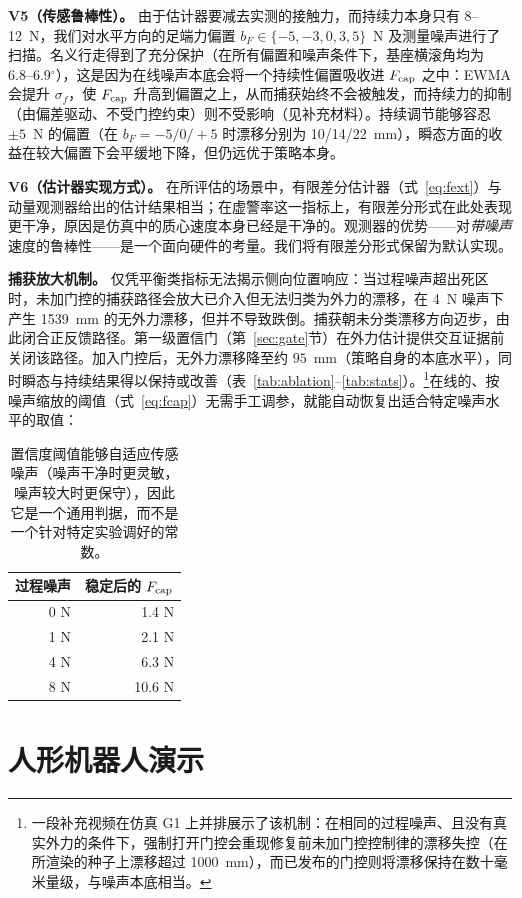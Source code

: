 \documentclass[journal]{IEEEtran}
\begin{document}
\textbf{V5（传感鲁棒性）。} 由于估计器要减去实测的接触力，而持续力本身只有 8–12~N，我们对水平方向的足端力偏置 $b_F\in\{-5,-3,0,3,5\}$~N 及测量噪声进行了扫描。名义行走得到了充分保护（在所有偏置和噪声条件下，基座横滚角均为 6.8–6.9$^\circ$），这是因为在线噪声本底会将一个持续性偏置吸收进 $F_{\rm cap}$ 之中：EWMA 会提升 $\sigma_f$，使 $F_{\rm cap}$ 升高到偏置之上，从而捕获始终不会被触发，而持续力的抑制（由偏差驱动、不受门控约束）则不受影响（见补充材料）。持续调节能够容忍 $\pm 5$~N 的偏置（在 $b_F=-5/0/+5$ 时漂移分别为 10/14/22~mm），瞬态方面的收益在较大偏置下会平缓地下降，但仍远优于策略本身。

\textbf{V6（估计器实现方式）。} 在所评估的场景中，有限差分估计器（式~\eqref{eq:fext}）与动量观测器给出的估计结果相当；在虚警率这一指标上，有限差分形式在此处表现更干净，原因是仿真中的质心速度本身已经是干净的。观测器的优势——对\emph{带噪声}速度的鲁棒性——是一个面向硬件的考量。我们将有限差分形式保留为默认实现。

\textbf{捕获放大机制。} 仅凭平衡类指标无法揭示侧向位置响应：当过程噪声超出死区时，未加门控的捕获路径会放大已介入但无法归类为外力的漂移，在 4~N 噪声下产生 1539~mm 的无外力漂移，但并不导致跌倒。捕获朝未分类漂移方向迈步，由此闭合正反馈路径。第一级置信门（第~\ref{sec:gate}节）在外力估计提供交互证据前关闭该路径。加入门控后，无外力漂移降至约 $95$~mm（策略自身的本底水平），同时瞬态与持续结果得以保持或改善（表~\ref{tab:ablation}–\ref{tab:stats}）。\footnote{一段补充视频在仿真 G1 上并排展示了该机制：在相同的过程噪声、且没有真实外力的条件下，强制打开门控会重现修复前未加门控控制律的漂移失控（在所渲染的种子上漂移超过 1000~mm），而已发布的门控则将漂移保持在数十毫米量级，与噪声本底相当。}在线的、按噪声缩放的阈值（式~\eqref{eq:fcap}）无需手工调参，就能自动恢复出适合特定噪声水平的取值：

\begin{table}[t]
\caption{置信度阈值能够自适应传感噪声（噪声干净时更灵敏，噪声较大时更保守），因此它是一个通用判据，而不是一个针对特定实验调好的常数。}
\label{tab:selfcal}
\centering
\begin{tabular}{rr}
\hline
过程噪声 & 稳定后的 $F_{\rm cap}$\\
\hline
0 N & 1.4 N\\
1 N & 2.1 N\\
4 N & 6.3 N\\
8 N & 10.6 N\\
\hline
\end{tabular}
\end{table}

\section{人形机器人演示}
\label{sec:demo}
\end{document}
